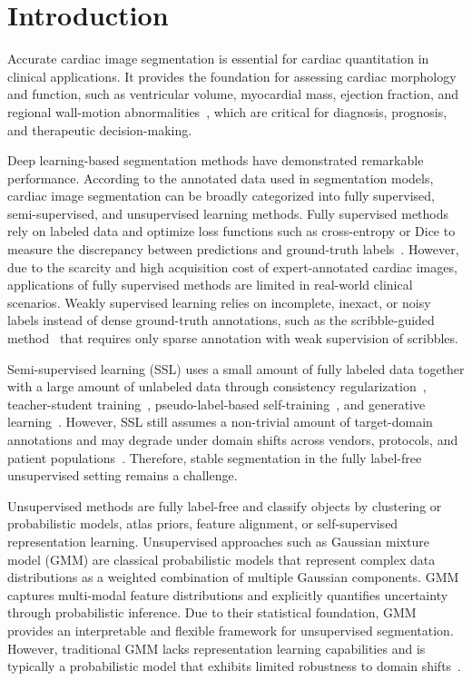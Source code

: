\documentclass[preprint,12pt]{elsarticle}
\begin{document}
%
\section{Introduction}

Accurate cardiac image segmentation is essential for cardiac quantitation in clinical applications. It provides the foundation for assessing cardiac morphology and function, such as ventricular volume, myocardial mass, ejection fraction, and regional wall-motion abnormalities~\cite{song2022deep,alabed2022quality}, which are critical for diagnosis, prognosis, and therapeutic decision-making.

Deep learning-based segmentation methods have demonstrated remarkable performance. 
According to the annotated data used in segmentation models, cardiac image segmentation can be broadly categorized into fully supervised, semi-supervised, and unsupervised learning methods. 
Fully supervised methods rely on labeled data and optimize loss functions such as cross-entropy or Dice to measure the discrepancy between predictions and ground-truth labels~\cite{unet,Bernard2018Deep,chang2022deeprecon}. However, due to the scarcity and high acquisition cost of expert-annotated cardiac images, applications of fully supervised methods are limited in real-world clinical scenarios.
Weakly supervised learning relies on incomplete, inexact, or noisy labels instead of dense ground-truth annotations, such as the scribble-guided method~\cite{zhang2022shapepu,zhuang2022cardiac} that requires only sparse annotation with weak supervision of scribbles.

Semi-supervised learning (SSL) uses a small amount of fully labeled data together with a large amount of unlabeled data through consistency regularization~\cite{WANG2025104341}, teacher-student training~\cite{tarvainen2017mean,yu2019uncertainty,DC-Net,QIU2025108613}, pseudo-label-based self-training~\cite{cps,CHAITANYA2023102792,SS-Net,ALHVR,LYU2023120836,YU2024106145}, and generative learning~\cite{DECOURT2020103884}.
%
%
However, SSL still assumes a non-trivial amount of target-domain annotations and may degrade under domain shifts across vendors, protocols, and patient populations~\cite{Campello2021Multi}. Therefore, stable segmentation in the fully label-free unsupervised setting remains a challenge.



Unsupervised methods are fully label-free and classify objects by clustering or probabilistic models, atlas priors, feature alignment, or self-supervised representation learning.
Unsupervised approaches such as Gaussian mixture model (GMM) are classical probabilistic models that represent complex data distributions as a weighted combination of multiple Gaussian components. GMM captures multi-modal feature distributions and explicitly quantifies uncertainty through probabilistic inference. Due to their statistical foundation, GMM provides an interpretable and flexible framework for unsupervised segmentation.
However, traditional GMM lacks representation learning capabilities and is typically a probabilistic model that exhibits limited robustness to domain shifts~\cite{tuia2016domain}.
\end{document}

